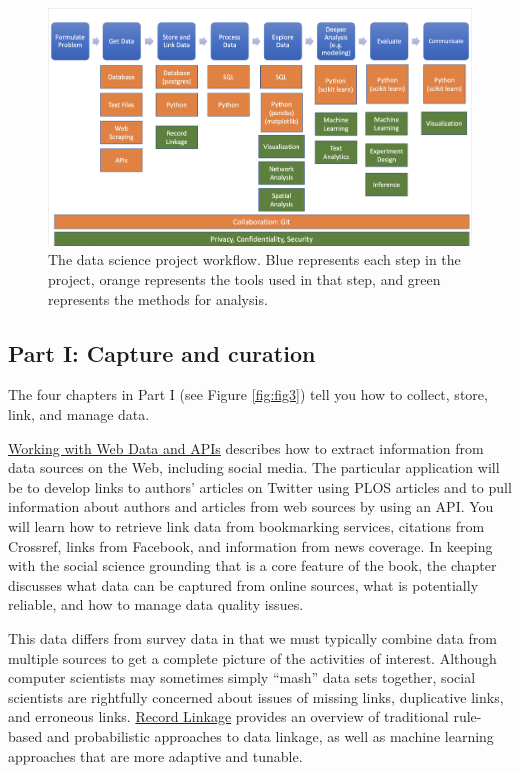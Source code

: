 \documentclass[]{krantz}
\begin{document}
\begin{figure}

{\centering \includegraphics[width=1\linewidth]{ChapterIntro/figures/projectflow} 

}

\caption{The data science project workflow. Blue represents each step in the project, orange represents the tools used in that step, and green represents the methods for analysis.}\label{fig:projectfig}
\end{figure}

\subsection{Part I: Capture and
curation}\label{part-i-capture-and-curation}

The four chapters in Part I (see Figure \ref{fig:fig3}) tell you how to
collect, store, link, and manage data.

\protect\hyperlink{chap:web}{Working with Web Data and APIs} describes
how to extract information from data sources on the Web, including
social media. The particular application will be to develop links to
authors' articles on Twitter using PLOS articles and to pull information
about authors and articles from web sources by using an API. You will
learn how to retrieve link data from bookmarking services, citations
from Crossref, links from Facebook, and information from news coverage.
In keeping with the social science grounding that is a core feature of
the book, the chapter discusses what data can be captured from online
sources, what is potentially reliable, and how to manage data quality
issues.

This data differs from survey data in that we must typically combine
data from multiple sources to get a complete picture of the activities
of interest. Although computer scientists may sometimes simply ``mash''
data sets together, social scientists are rightfully concerned about
issues of missing links, duplicative links, and erroneous links.
\protect\hyperlink{chap:link}{Record Linkage} provides an overview of
traditional rule-based and probabilistic approaches to data linkage, as
well as machine learning approaches that are more adaptive and tunable.
\end{document}
